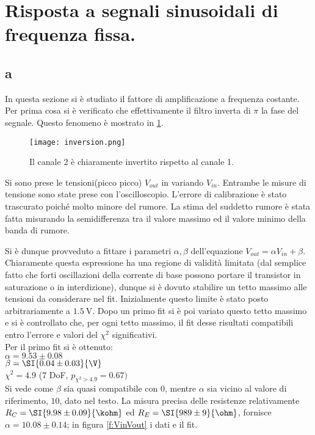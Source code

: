 \section{Risposta a segnali sinusoidali di frequenza fissa.}
\subsection{a}
In questa sezione si è studiato il fattore di amplificazione a frequenza costante.
Per prima cosa si è verificato che effettivamente il filtro inverta di $\pi$ la fase del segnale. Questo fenomeno è mostrato in \ref{f:Inv}.\\
\begin{figure}
\centering
	\texttt{[image: inversion.png]}
	\caption{Il canale 2 è chiaramente invertito rispetto al canale 1.\label{f:Inv}}
\end{figure}
Si sono prese le tensioni(picco picco) $V_{out}$ in variando $V_{in}$. Entrambe le misure di tensione sono state prese con l'oscilloscopio. L'errore di calibrazione è stato trascurato poiché molto minore del rumore. La stima del suddetto rumore è stata fatta misurando la semidifferenza tra il valore massimo ed il valore minimo della banda di rumore.%

Si è dunque provveduto a fittare i parametri $\alpha, \beta$ dell'equazione $V_{out}=\alpha V_{in} + \beta$. Chiaramente questa espressione ha una regione di validità limitata (dal semplice fatto che forti oscillazioni della corrente di base possono portare il transistor in saturazione o in interdizione), dunque si è dovuto stabilire un tetto massimo alle tensioni da considerare nel fit. Inizialmente questo limite è stato posto arbitrariamente a $\SI{1.5}{\V}$. Dopo un primo fit si è poi variato questo tetto massimo e si è controllato che, per ogni tetto massimo, il fit desse risultati compatibili entro l'errore e valori del $\chi^2$ significativi.\\
Per il primo fit si è ottenuto:\\
$\alpha=9.53 \pm 0.08$\\
$\beta=\SI{0.04 \pm 0.03}{\V}$\\
$\chi^2= 4.9$ ($7$ DoF, $p_{\chi^2>4.9} = 0.67)$\\

Si vede come $\beta$ sia quasi compatibile con 0, mentre $\alpha$ sia vicino al valore di riferimento, $10$, dato nel testo. La misura precisa delle resistenze relativamente $R_C=\SI{9.98\pm 0.09}{\kohm}$ ed $R_E=\SI{989 \pm 9}{\ohm}$, fornisce $\alpha=10.08 \pm 0.14$; in figura \ref{f:VinVout} i dati e il fit.


